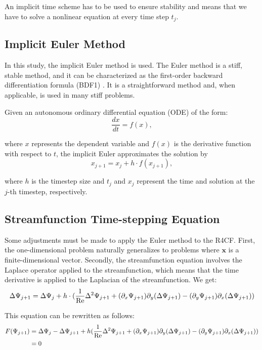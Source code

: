 An implicit time scheme has to be used to ensure stability and means that we
have to solve a nonlinear equation at every time step $t_j$. 

\subsection{Implicit Euler Method}

In this study, the implicit Euler method is used. The Euler method is a stiff,
stable method, and it can be characterized as the first-order backward
differentiation formula (BDF1) \citep{meseguer2020}. It is a straightforward
method and, when applicable, is used in many stiff problems.

Given an autonomous ordinary differential equation (ODE) of the form:
\begin{equation}
  \frac{{dx}}{{dt}} = f(x),
\end{equation}

where $x$ represents the dependent variable and
$f(x)$ is the derivative function with respect to $t$, the implicit Euler
approximates the solution by
\begin{equation}
  x_{j+1} = x_j + h \cdot f(x_{j+1}),
\end{equation}

where $h$ is the timestep size and
$t_j$ and $x_j$ represent the time and solution at the $j$-th timestep,
respectively.

\subsection{Streamfunction Time-stepping Equation}

Some adjustments must be made to apply the Euler method to the R4CF. First, the
one-dimensional problem naturally generalizes to problems where $\mathbf{x}$ is
a finite-dimensional vector. Secondly, the streamfunction equation involves the
Laplace operator applied to the streamfunction, which means that the time
derivative is applied to the Laplacian of the streamfunction. We get:  
\begin{align}
  \Delta\Psi_{j+1} = \Delta\Psi_j + h \cdot (\frac{1}{\mathrm{Re}}\Delta^2 \Psi_{j+1} +
  (\partial_x \Psi_{j+1}) \partial_y(\Delta \Psi_{j+1}) -
  (\partial_y \Psi_{j+1}) \partial_x(\Delta \Psi_{j+1})) \label{eq:str_timestepping}
\end{align}

This equation can be rewritten as follows:
\begin{align}
  F(\Psi_{j+1}) & = \Delta\Psi_j - \Delta\Psi_{j+1} + h (\frac{1}{\mathrm{Re}}\Delta^2 \Psi_{j+1} +
  (\partial_x \Psi_{j+1}) \partial_y(\Delta \Psi_{j+1}) -
  (\partial_y \Psi_{j+1}) \partial_x(\Delta \Psi_{j+1})) \nonumber \\
  & =  0 \label{eq:newton_ts}
\end{align}

